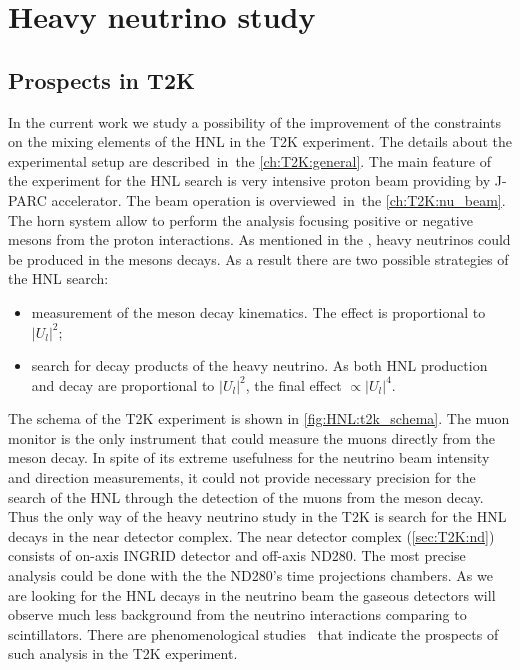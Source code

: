\documentclass[../main.tex]{subfiles}
\begin{document}
\renewcommand{\labelitemi}{\ding{226}}
\renewcommand{\labelitemii}{\ding{227}}

\part{Heavy neutrino study}

\chapter{Prospects in T2K}
\label{ch:hnl}

In the current work we study a possibility of the improvement of the constraints on the mixing elements of the HNL in the T2K experiment. The details about the experimental setup are described~in~the \autoref{ch:T2K:general}. The main feature of the experiment for the HNL search is very intensive proton beam providing by J-PARC accelerator. The beam operation is overviewed~in~the \autoref{ch:T2K:nu_beam}. The horn system allow to perform the analysis focusing positive or negative mesons from the proton interactions. As mentioned in the , heavy neutrinos could be produced in the mesons decays. As a result there are two possible strategies of the HNL search:
\begin{itemize}
    \item measurement of the meson decay kinematics. The effect is proportional to $\left|U_l\right|^2$;
    \item search for decay products of the heavy neutrino. As both HNL production and decay are proportional to $\left|U_l\right|^2$, the final effect $\propto\left|U_l\right|^4$.
\end{itemize}

The schema of the T2K experiment is shown in \autoref{fig:HNL:t2k_schema}. The muon monitor is the only instrument that could measure the muons directly from the meson decay. In spite of its extreme usefulness for the neutrino beam intensity and direction measurements, it could not provide necessary precision for the search of the HNL through the detection of the muons from the meson decay. Thus the only way of the heavy neutrino study in the T2K is search for the HNL decays in the near detector complex. The near detector complex (\autoref{sec:T2K:nd}) consists of on-axis INGRID detector and off-axis ND280. The most precise analysis could be done with the the ND280's time projections chambers. As we are looking for the HNL decays in the neutrino beam the gaseous detectors will observe much less background from the neutrino interactions comparing to scintillators. There are phenomenological studies~\cite{Asaka2012} that indicate the prospects of such analysis in the T2K experiment.
\end{document}
